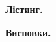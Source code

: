 \documentclass{extreport}
\begin{document}
\noindent\textbf{Лістинг.}

%

%

\noindent\textbf{Висновки.}
\end{document}
